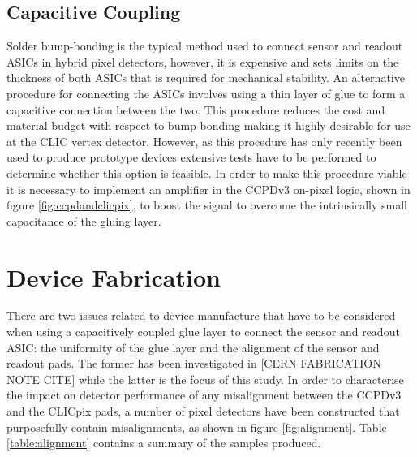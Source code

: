 
\subsection{Capacitive Coupling}

Solder bump-bonding is the typical method used to connect sensor and readout ASICs in hybrid pixel detectors, however, it is expensive and sets limits on the thickness of both ASICs that is required for mechanical stability.  An alternative procedure for connecting the ASICs involves using a thin layer of glue to form a capacitive connection between the two.  This procedure reduces the cost and material budget with respect to bump-bonding making it highly desirable for use at the CLIC vertex detector.  However, as this procedure has only recently been used to produce prototype devices extensive tests have to be performed to determine whether this option is feasible.  In order to make this procedure viable it is necessary to implement an amplifier in the CCPDv3 on-pixel logic, shown in figure \ref{fig:ccpdandclicpix}, to boost the signal to overcome the intrinsically small capacitance of the gluing layer.


\section{Device Fabrication}

There are two issues related to device manufacture that have to be considered when using a capacitively coupled glue layer to connect the sensor and readout ASIC: the uniformity of the glue layer and the alignment of the sensor and readout pads.  The former has been investigated in [CERN FABRICATION NOTE CITE] while the latter is the focus of this study.  In order to characterise the impact on detector performance of any misalignment between the CCPDv3 and the CLICpix pads, a number of pixel detectors have been constructed that purposefully contain misalignments, as shown in figure \ref{fig:alignment}.  Table \ref{table:alignment} contains a summary of the samples produced.


